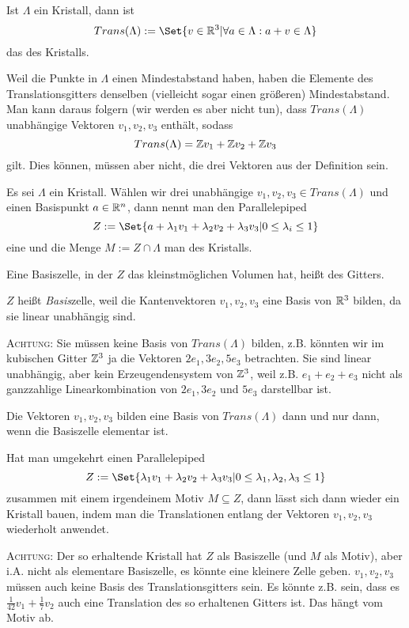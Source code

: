 \begin{definition}
Ist $\Lambda$ ein Kristall, dann ist
\[Trans(\Lambda) := \Set{v\in\IR^3 | \forall a\in\Lambda: a+v\in\Lambda}\]
das  des Kristalls.
\end{definition}

\begin{remark}
Weil die Punkte in $\Lambda$ einen Mindestabstand haben, haben die Elemente des Translationsgitters denselben (vielleicht sogar einen größeren) Mindestabstand. Man kann daraus folgern (wir werden es aber nicht tun), dass $Trans(\Lambda)$ unabhängige Vektoren $v_1,v_2,v_3$ enthält, sodass
\[Trans(\Lambda) = \mathbb{Z} v_1+\mathbb{Z} v_2+\mathbb{Z} v_3\]
gilt. Dies können, müssen aber nicht, die drei Vektoren aus der Definition sein.
\end{remark}

\begin{definition}
Es sei $\Lambda$ ein Kristall. Wählen wir drei unabhängige $v_1,v_2,v_3\in Trans(\Lambda)$ und einen Basispunkt $a\in\mathbb{R}^n$, dann nennt man den Parallelepiped
\[Z:=\Set{a+\lambda_1 v_1 + \lambda_2 v_2 + \lambda_3 v_3 | 0\leq \lambda_i \leq 1}\]
eine  und die Menge $M:=Z\cap\Lambda$ man  des Kristalls.

Eine Basiszelle, in der $Z$ das kleinstmöglichen Volumen hat, heißt  des Gitters.
\end{definition}

\begin{remark}
$Z$ heißt \emph{Basis}zelle, weil die Kantenvektoren $v_1,v_2,v_3$ eine Basis von $\mathbb{R}^3$ bilden, da sie linear unabhängig sind.

\textsc{Achtung}: Sie müssen keine Basis von $Trans(\Lambda)$ bilden, z.B. könnten wir im kubischen Gitter $\mathbb{Z}^3$ ja die Vektoren $2e_1,3e_2,5e_3$ betrachten. Sie sind linear unabhängig, aber kein Erzeugendensystem von $\mathbb{Z}^3$, weil z.B. $e_1+e_2+e_3$ nicht als ganzzahlige Linearkombination von $2e_1, 3e_2$ und $5e_3$ darstellbar ist.

Die Vektoren $v_1,v_2,v_3$ bilden eine Basis von $Trans(\Lambda)$ dann und nur dann, wenn die Basiszelle elementar ist.
\end{remark}

\begin{remark}
Hat man umgekehrt einen Parallelepiped
\[Z:=\Set{\lambda_1v_1+\lambda_2v_2+\lambda_3v_3 | 0\leq\lambda_1,\lambda_2,\lambda_3\leq 1}\]
zusammen mit einem irgendeinem Motiv $M\subseteq Z$, dann lässt sich dann wieder ein Kristall bauen, indem man die Translationen entlang der Vektoren $v_1,v_2,v_3$ wiederholt anwendet.

\textsc{Achtung}: Der so erhaltende Kristall hat $Z$ als Basiszelle (und $M$ als Motiv), aber i.A. nicht als elementare Basiszelle, es könnte eine kleinere Zelle geben. $v_1,v_2,v_3$ müssen auch keine Basis des Translationsgitters sein. Es könnte z.B. sein, dass es $\frac{1}{42}v_1+\frac{1}{7}v_2$ auch eine Translation des so erhaltenen Gitters ist. Das hängt vom Motiv ab.
\end{remark}

